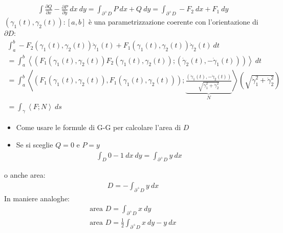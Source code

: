 \documentclass[a4paper, oneside]{article}
\begin{document}
  \begin{gather*}
    \int \frac{\partial Q}{\partial x} - \frac{\partial P}{\partial y} \ dx \ dy = \int_{\partial^+ D} P \ dx + Q \ dy = \int_{\partial^+ D} -F_2 \ dx + F_1 \ dy
  \end{gather*}
   $\left( \gamma_1(t), \gamma_2(t) \right) : [a,b]$ è una parametrizzazione coerente con l'orientazione di $\partial D$:
  \begin{gather*}
    \int_a^b -F_2 \left( \gamma_1(t), \gamma_2 (t) \right) \dot{\gamma}_1(t) + F_1\left( \gamma_1(t), \gamma_2(t) \right) \dot{\gamma}_2(t) \ dt \\
    = \int_a^b \left\langle \left( F_1\left( \gamma_1(t), \gamma_2(t) \right) F_2\left( \gamma_1(t), \gamma_2(t) \right) ; \left( \dot{\gamma}_2(t) , -\dot{\gamma}_1(t) \right)    \right)  \right\rangle \ dt\\
    = \int_a^b \left\langle \left( F_1\left( \gamma_1(t), \gamma_2(t) \right), F_1\left( \gamma_1(t), \gamma_2(t) \right)  \right) ; \underbrace{\frac{\left(\dot{\gamma}_1(t) , -\dot{\gamma}_2(t)\right) }{\sqrt{\dot{\gamma}_1^2 + \dot{\gamma}_2^2}}}_{N}  \right\rangle  \left( \sqrt{\dot{\gamma}_1^2 + \dot{\gamma}_2^2} \right)\\
    = \int_\gamma \left\langle F ; N \right\rangle  \ ds
  \end{gather*}
  \begin{itemize}
    \item Come usare le formule di G-G per calcolare l'area di $D$
    \item Se si sceglie $Q = 0$ e $P = y$
    \begin{gather*}
      \int_D 0-1 \ dx \ dy = \int_{\partial^+ D} y \ dx
    \end{gather*}
  \end{itemize}
    o anche area:
    \begin{gather*}
      D = -\int_{\partial^+ D} y \ dx
    \end{gather*}
    In maniere analoghe:
    \begin{gather*}
      \text{area }D = \int_{\partial^+ D} x \ dy\\
      \text{area }D = \frac{1}{2}\int_{\partial^+ D} x \ dy - y \ dx
    \end{gather*}


\end{document}
